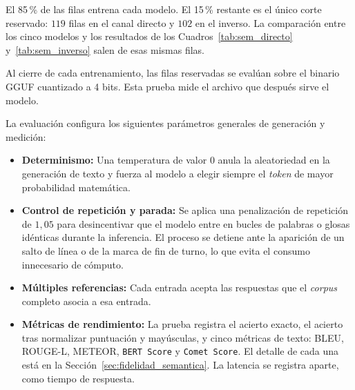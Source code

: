 El 85\,\% de las filas entrena cada modelo. El 15\,\% restante es el único corte reservado: $119$ filas en el canal directo y $102$ en el inverso. La comparación entre los cinco modelos y los resultados de los Cuadros~\ref{tab:sem_directo} y~\ref{tab:sem_inverso} salen de esas mismas filas.

Al cierre de cada entrenamiento, las filas reservadas se evalúan sobre el binario GGUF cuantizado a 4 bits. Esta prueba mide el archivo que después sirve el modelo.

La evaluación configura los siguientes parámetros generales de generación y medición:
\begin{itemize}
    \item \textbf{Determinismo:} Una temperatura de valor $0$ anula la aleatoriedad en la generación de texto y fuerza al modelo a elegir siempre el \textit{token} de mayor probabilidad matemática.
    \item \textbf{Control de repetición y parada:} Se aplica una penalización de repetición de $1{,}05$ para desincentivar que el modelo entre en bucles de palabras o glosas idénticas durante la inferencia. El proceso se detiene ante la aparición de un salto de línea o de la marca de fin de turno, lo que evita el consumo innecesario de cómputo.
    \item \textbf{Múltiples referencias:} Cada entrada acepta las respuestas que el \textit{corpus} completo asocia a esa entrada. 
    \item \textbf{Métricas de rendimiento:} La prueba registra el acierto exacto, el acierto tras normalizar puntuación y mayúsculas, y cinco métricas de texto: BLEU, ROUGE-L, METEOR, \texttt{BERT Score} y \texttt{Comet Score}. El detalle de cada una está en la Sección~\ref{sec:fidelidad_semantica}. La latencia se registra aparte, como tiempo de respuesta.
\end{itemize}

